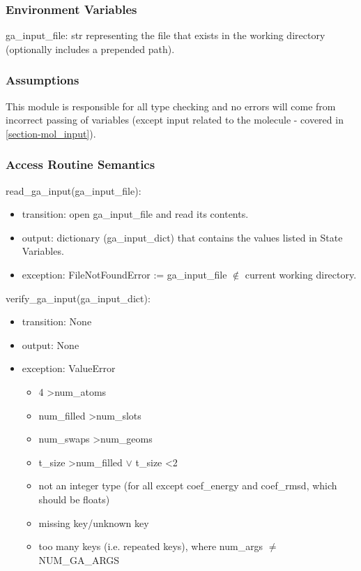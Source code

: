 \documentclass[12pt, titlepage]{article}
\begin{document}
\subsubsection{Environment Variables}

ga\_input\_file: str representing the file that exists in the working directory 
(optionally includes a prepended path).

\subsubsection{Assumptions}

This module is responsible for all type checking and no errors will come from 
incorrect passing of variables (except input related to the molecule - covered 
in \ref{section-mol_input}).

\subsubsection{Access Routine Semantics}

\noindent read\_ga\_input(ga\_input\_file):
\begin{itemize}
	\item transition: open ga\_input\_file and read its contents.
	\item output: dictionary (ga\_input\_dict) that contains the values listed 
	in State Variables.
	\item exception: FileNotFoundError := ga\_input\_file $\notin$ current 
	working directory.
\end{itemize}

\noindent verify\_ga\_input(ga\_input\_dict):
\begin{itemize}
	\item transition: None
	\item output: None
	\item exception: ValueError
	\begin{itemize}
		\item 4 \textgreater num\_atoms
		\item num\_filled \textgreater num\_slots
		\item num\_swaps \textgreater num\_geoms
		\item t\_size \textgreater num\_filled $\lor$ t\_size \textless 2
		\item not an integer type (for all except coef\_energy and coef\_rmsd, 
		which should be floats)
		\item missing key/unknown key
		\item too many keys (i.e. repeated keys), where num\_args $\neq$ 
		NUM\_GA\_ARGS 
	\end{itemize}
\end{itemize}
\end{document}
